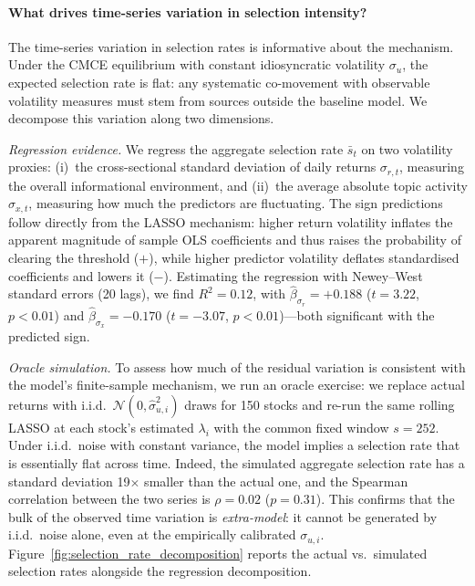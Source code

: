 \paragraph{What drives time-series variation in selection intensity?}
The time-series variation in selection rates is informative about the mechanism.
Under the CMCE equilibrium with constant idiosyncratic volatility $\sigma_u$, the
expected selection rate is flat: any systematic co-movement with observable volatility
measures must stem from sources outside the baseline model.
We decompose this variation along two dimensions.

\emph{Regression evidence.}
We regress the aggregate selection rate $\bar{s}_t$ on two volatility proxies: (i)~the
cross-sectional standard deviation of daily returns $\sigma_{r,t}$, measuring the
overall informational environment, and (ii)~the average absolute topic activity
$\sigma_{x,t}$, measuring how much the predictors are fluctuating.
The sign predictions follow directly from the LASSO mechanism: higher return volatility
inflates the apparent magnitude of sample OLS coefficients and thus raises the
probability of clearing the threshold ($+$), while higher predictor volatility deflates
standardised coefficients and lowers it ($-$).
Estimating the regression with Newey--West standard errors (20 lags), we find
$R^2 = 0.12$, with $\hat\beta_{\sigma_r} = +0.188$ ($t = 3.22$, $p < 0.01$) and
$\hat\beta_{\sigma_x} = -0.170$ ($t = -3.07$, $p < 0.01$)---both significant with
the predicted sign.

\emph{Oracle simulation.}
To assess how much of the residual variation is consistent with the model's finite-sample
mechanism, we run an oracle exercise: we replace actual returns with i.i.d.\
$\mathcal{N}(0, \hat\sigma_{u,i}^2)$ draws for 150 stocks and re-run the same rolling
LASSO at each stock's estimated $\lambda_i$ with the common fixed window $s=252$.
Under i.i.d.\ noise with constant variance, the model implies a selection rate that is
essentially flat across time.
Indeed, the simulated aggregate selection rate has a standard deviation 19$\times$ smaller
than the actual one, and the Spearman correlation between the two series is $\rho = 0.02$
($p = 0.31$).
This confirms that the bulk of the observed time variation is \emph{extra-model}: it
cannot be generated by i.i.d.\ noise alone, even at the empirically calibrated
$\sigma_{u,i}$.
Figure~\ref{fig:selection_rate_decomposition} reports the actual vs.\ simulated selection
rates alongside the regression decomposition.

